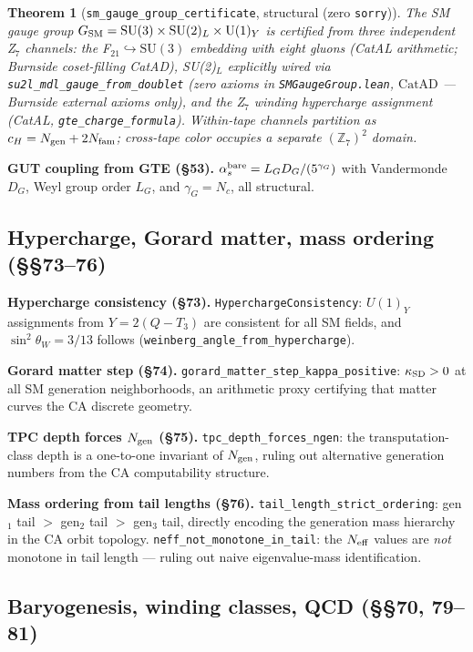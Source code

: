 \documentclass[11pt,a4paper]{article}
\newtheorem{theorem}{Theorem}[section]
\theoremstyle{definition}
\newcommand{\CatAD}{\ensuremath{\mathrm{CatAD}}}
\begin{document}
\begin{theorem}[\lstinline|sm_gauge_group_certificate|, structural (zero \texttt{sorry})]
The SM gauge group $G_{\rm SM} = \mathrm{SU}(3)\times\mathrm{SU}(2)_L\times\mathrm{U}(1)_Y$
is certified from three independent Z$_7$ channels: the F$_{21}\hookrightarrow\mathrm{SU}(3)$
embedding with eight gluons (CatAL arithmetic; Burnside coset-filling CatAD),
SU(2)$_L$ explicitly wired via \lstinline|su2l_mdl_gauge_from_doublet| (zero axioms in
\texttt{SMGaugeGroup.lean}, $\CatAD$ --- Burnside external axioms only),
and the Z$_7$ winding hypercharge assignment (CatAL, \lstinline|gte_charge_formula|).
Within-tape channels partition as $c_H = N_{\rm gen} + 2N_{\rm fam}$; cross-tape color
occupies a separate $(\mathbb{Z}_7)^2$ domain.
\end{theorem}

\textbf{GUT coupling from GTE (§53).}  $\alpha_s^{\rm bare} = L_G D_G / (5^{\gamma_G})$
with Vandermonde $D_G$, Weyl group order $L_G$, and $\gamma_G = N_c$, all structural.

\subsection{Hypercharge, Gorard matter, mass ordering (§§73--76)}\label{subsec:gut-phys}

\textbf{Hypercharge consistency (§73).}
\lstinline|HyperchargeConsistency|: $U(1)_Y$ assignments from $Y = 2(Q - T_3)$ are
consistent for all SM fields, and $\sin^2\theta_W = 3/13$ follows
(\lstinline|weinberg_angle_from_hypercharge|).

\textbf{Gorard matter step (§74).}
\lstinline|gorard_matter_step_kappa_positive|: $\kappa_{\rm SD} > 0$ at all SM
generation neighborhoods, an arithmetic proxy certifying that matter curves the
CA discrete geometry.

\textbf{TPC depth forces $N_{\rm gen}$ (§75).}
\lstinline|tpc_depth_forces_ngen|: the transputation-class depth is a one-to-one
invariant of $N_{\rm gen}$, ruling out alternative generation numbers from the
CA computability structure.

\textbf{Mass ordering from tail lengths (§76).}
\lstinline|tail_length_strict_ordering|: gen$_1$ tail $>$ gen$_2$ tail $>$ gen$_3$ tail,
directly encoding the generation mass hierarchy in the CA orbit topology.
\lstinline|neff_not_monotone_in_tail|: the $N_{\rm eff}$ values are \emph{not}
monotone in tail length — ruling out naive eigenvalue-mass identification.

\subsection{Baryogenesis, winding classes, QCD (§§70, 79--81)}\label{subsec:gut-baryogenesis}
\end{document}
